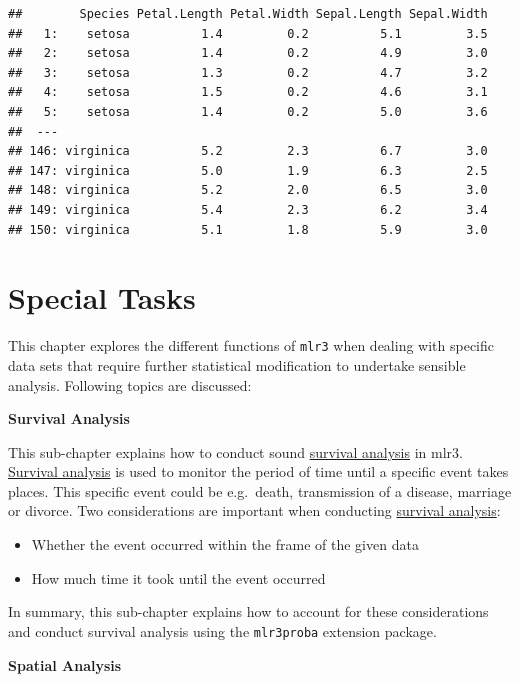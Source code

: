 \documentclass[]{scrbook}
\providecommand{\tightlist}{%
  \setlength{\itemsep}{0pt}\setlength{\parskip}{0pt}}
\begin{document}
\begin{verbatim}
##        Species Petal.Length Petal.Width Sepal.Length Sepal.Width
##   1:    setosa          1.4         0.2          5.1         3.5
##   2:    setosa          1.4         0.2          4.9         3.0
##   3:    setosa          1.3         0.2          4.7         3.2
##   4:    setosa          1.5         0.2          4.6         3.1
##   5:    setosa          1.4         0.2          5.0         3.6
##  ---                                                            
## 146: virginica          5.2         2.3          6.7         3.0
## 147: virginica          5.0         1.9          6.3         2.5
## 148: virginica          5.2         2.0          6.5         3.0
## 149: virginica          5.4         2.3          6.2         3.4
## 150: virginica          5.1         1.8          5.9         3.0
\end{verbatim}

\hypertarget{special-tasks}{%
\chapter{Special Tasks}\label{special-tasks}}

This chapter explores the different functions of \texttt{mlr3} when dealing with specific data sets that require further statistical modification to undertake sensible analysis.
Following topics are discussed:

\textbf{Survival Analysis}

This sub-chapter explains how to conduct sound \protect\hyperlink{survival}{survival analysis} in mlr3.
\protect\hyperlink{survival}{Survival analysis} is used to monitor the period of time until a specific event takes places.
This specific event could be e.g.~death, transmission of a disease, marriage or divorce.
Two considerations are important when conducting \protect\hyperlink{survival}{survival analysis}:

\begin{itemize}
\tightlist
\item
  Whether the event occurred within the frame of the given data
\item
  How much time it took until the event occurred
\end{itemize}

In summary, this sub-chapter explains how to account for these considerations and conduct survival analysis using the \texttt{mlr3proba} extension package.

\textbf{Spatial Analysis}
\end{document}
